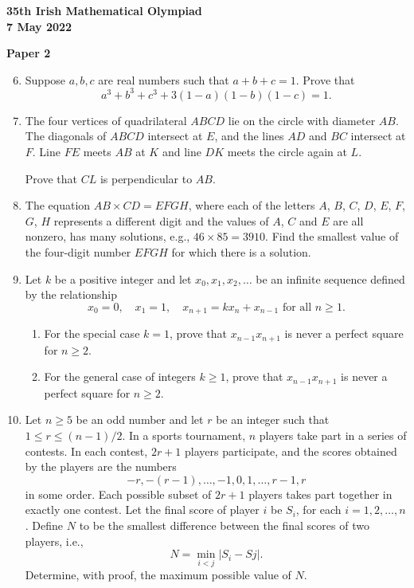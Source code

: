 \documentclass[12pt]{article}
\begin{document}
\newpage
\begin{center}
{\large\bfseries 35th Irish Mathematical Olympiad\\7 May 2022}
\end{center}
\bigskip\noindent\textbf{Paper 2}\bigskip
\begin{enumerate}
\setcounter{enumi}{5}
\item Suppose $a, b, c$ are real numbers such that $a + b + c = 1$. Prove that
\[
a^3 + b^3 + c^3 + 3(1-a)(1-b)(1-c) = 1.
\]

\item The four vertices of quadrilateral $ABCD$ lie on the circle with diameter $AB$. The diagonals of $ABCD$ intersect at $E$, and the lines $AD$ and $BC$ intersect at $F$. Line $FE$ meets $AB$ at $K$ and line $DK$ meets the circle again at $L$.

Prove that $CL$ is perpendicular to $AB$.

\item The equation $AB \times CD = EFGH$, where each of the letters $A$, $B$, $C$, $D$, $E$, $F$, $G$, $H$ represents a different digit and the values of $A$, $C$ and $E$ are all nonzero, has many solutions, e.g., $46 \times 85 = 3910$. Find the smallest value of the four-digit number $EFGH$ for which there is a solution.

\item Let $k$ be a positive integer and let $x_0, x_1, x_2, \ldots$ be an infinite sequence defined by the relationship
\[
x_0 = 0, \quad x_1 = 1, \quad x_{n+1} = kx_n + x_{n-1} \text{ for all } n \ge 1.
\]
\begin{enumerate}
\item[(a)] For the special case $k = 1$, prove that $x_{n-1}x_{n+1}$ is never a perfect square for $n \ge 2$.
\item[(b)] For the general case of integers $k \ge 1$, prove that $x_{n-1}x_{n+1}$ is never a perfect square for $n \ge 2$.
\end{enumerate}

\item Let $n \ge 5$ be an odd number and let $r$ be an integer such that $1 \le r \le (n-1)/2$. In a sports tournament, $n$ players take part in a series of contests. In each contest, $2r+1$ players participate, and the scores obtained by the players are the numbers
\[
-r, -(r-1), \ldots, -1, 0, 1, \ldots, r-1, r
\]
in some order. Each possible subset of $2r+1$ players takes part together in exactly one contest. Let the final score of player $i$ be $S_i$, for each $i = 1, 2, \ldots, n$. Define $N$ to be the smallest difference between the final scores of two players, i.e.,
\[
N = \min_{i < j} |S_i - Sj|.
\]
Determine, with proof, the maximum possible value of $N$.
\end{enumerate}
\end{document}

